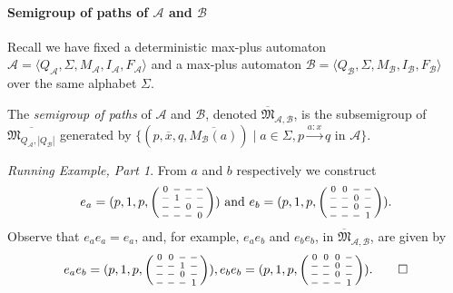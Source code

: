 \documentclass{lmcs}
\theoremstyle{remark}
\newcommand{\ideal}{\mathfrak{M}}
\newcommand{\autA}{\mathcal{A}}
\newcommand{\autB}{\mathcal{B}}
\newcommand{\nopath}{-}
\newenvironment{smallpmatrix}
  {\left(\begin{smallmatrix}}
  {\end{smallmatrix}\right)}
\theoremstyle{remark}
\newtheorem{runningexample/}{Running Example, Part}
\newenvironment{runningexample}
  {\renewcommand{\qedsymbol}{\color{darkgray}\ensuremath{\lrcorner}}%
   \pushQED{\qed}\begin{runningexample/}}
  {\popQED\end{runningexample/}}
\begin{document}
\paragraph*{Semigroup of paths of $\autA$ and $\autB$}

Recall we have fixed a deterministic max-plus automaton $\autA = \langle Q_\autA, \Sigma, M_\autA, I_\autA, F_\autA\rangle$ and a max-plus automaton $\autB = \langle Q_\autB, \Sigma, M_\autB, I_\autB, F_\autB\rangle$ over the same alphabet $\Sigma$.

\begin{defi}\label{def:sgofp}
The \emph{semigroup of paths} of $\autA$ and $\autB$, denoted $\overline{\ideal}_{\autA,\autB}$, is the subsemigroup of $\overline{\ideal_{Q_\autA,|Q_\autB|}}$ generated by $\{(p,\overline{x},q,\overline{M_\autB(a)}) \mid a\in \Sigma, p\xrightarrow{a:x}q \text{ in } \autA\}$.
\end{defi}

\begin{runningexample}
From $a$ and $b$ respectively we construct
\[e_a = (p,1,p,
\begin{smallpmatrix}
0 & \nopath & \nopath & \nopath\\
\nopath & 1 & \nopath & \nopath\\
\nopath & \nopath & 0 & \nopath\\
\nopath & \nopath & \nopath & 0
\end{smallpmatrix}) \text{ and } e_b = (p,1,p,
\begin{smallpmatrix}
0 & 0 & \nopath & \nopath\\
\nopath & \nopath & 0 & \nopath\\
\nopath & \nopath & 0 & \nopath\\
\nopath & \nopath & \nopath & 1
\end{smallpmatrix}).\] 
Observe that $e_ae_a = e_a $, and, for example, $e_ae_b$ and $e_be_b$, in $\overline{\ideal}_{\autA,\autB}$, are given by  \[e_ae_b= (p,1,p,
\begin{smallpmatrix}
0 & 0 & \nopath & \nopath\\
\nopath & \nopath & 1 & \nopath\\
\nopath & \nopath & 0 & \nopath\\
\nopath & \nopath & \nopath & 1
\end{smallpmatrix}),  e_be_b=  (p,1,p,
\begin{smallpmatrix}
0 & 0 & 0 & \nopath\\
\nopath & \nopath & 0 & \nopath\\
\nopath & \nopath & 0 & \nopath\\
\nopath & \nopath & \nopath & 1
\end{smallpmatrix}).
\qedhere\] 
\end{runningexample}
\end{document}
